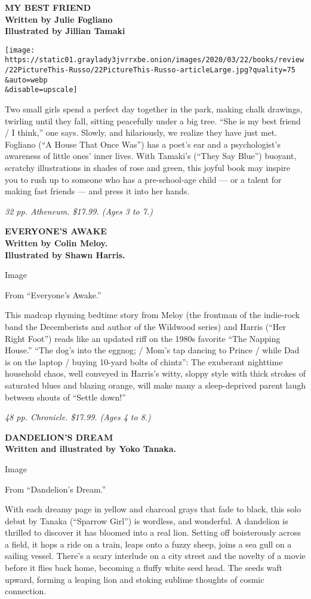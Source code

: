 \textbf{MY BEST FRIEND}\\
\textbf{Written by Julie Fogliano}\\
\textbf{Illustrated by Jillian Tamaki}

\texttt{[image: https://static01.graylady3jvrrxbe.onion/images/2020/03/22/books/review/22PictureThis-Russo/22PictureThis-Russo-articleLarge.jpg?quality=75\\\&auto=webp\\\&disable=upscale]}

Two small girls spend a perfect day together in the park, making chalk
drawings, twirling until they fall, sitting peacefully under a big tree.
``She is my best friend / I think,'' one says. Slowly, and hilariously,
we realize they have just met. Fogliano (``A House That Once Was'') has
a poet's ear and a psychologist's awareness of little ones' inner lives.
With Tamaki's (``They Say Blue'') buoyant, scratchy illustrations in
shades of rose and green, this joyful book may inspire you to rush up to
someone who has a pre-school-age child --- or a talent for making fast
friends --- and press it into her hands.

\emph{32 pp. Atheneum. \$17.99. (Ages 3 to 7.)}

\textbf{EVERYONE'S AWAKE}\\
\textbf{Written by Colin Meloy.}\\
\textbf{Illustrated by Shawn Harris.}

Image

From ``Everyone's Awake.''

This madcap rhyming bedtime story from Meloy (the frontman of the
indie-rock band the Decemberists and author of the Wildwood series) and
Harris (``Her Right Foot'') reads like an updated riff on the 1980s
favorite ``The Napping House.'' ``The dog's into the eggnog; / Mom's tap
dancing to Prince / while Dad is on the laptop / buying 10-yard bolts of
chintz'': The exuberant nighttime household chaos, well conveyed in
Harris's witty, sloppy style with thick strokes of saturated blues and
blazing orange, will make many a sleep-deprived parent laugh between
shouts of ``Settle down!''

\emph{48 pp. Chronicle. \$17.99. (Ages 4 to 8.)}

\textbf{DANDELION'S DREAM}\\
\textbf{Written and illustrated by Yoko Tanaka.}

Image

From ``Dandelion's Dream.''

With each dreamy page in yellow and charcoal grays that fade to black,
this solo debut by Tanaka (``Sparrow Girl'') is wordless, and wonderful.
A dandelion is thrilled to discover it has bloomed into a real lion.
Setting off boisterously across a field, it hops a ride on a train,
leaps onto a fuzzy sheep, joins a sea gull on a sailing vessel. There's
a scary interlude on a city street and the novelty of a movie before it
flies back home, becoming a fluffy white seed head. The seeds waft
upward, forming a leaping lion and stoking sublime thoughts of cosmic
connection.

